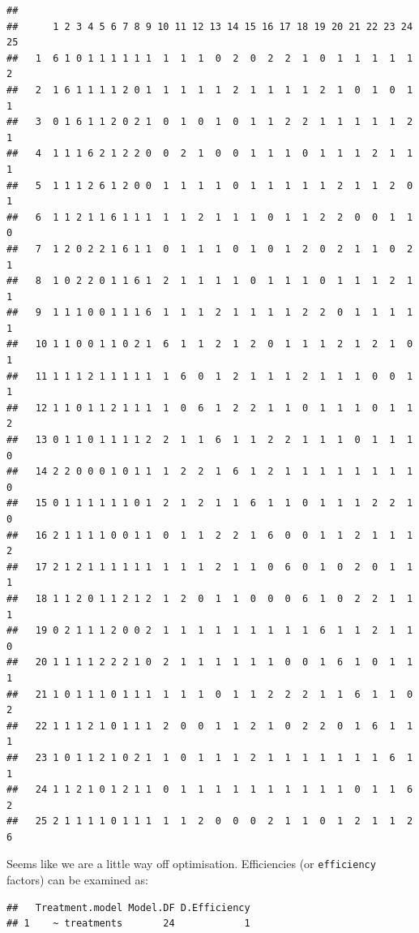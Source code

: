 \documentclass[
]{book}
\newenvironment{Shaded}{\begin{snugshade}}{\end{snugshade}}
\newcommand{\FloatTok}[1]{\textcolor[rgb]{0.00,0.00,0.81}{#1}}
\newcommand{\NormalTok}[1]{#1}
\newcommand{\SpecialCharTok}[1]{\textcolor[rgb]{0.00,0.00,0.00}{#1}}
\begin{document}
\begin{verbatim}
##     
##      1 2 3 4 5 6 7 8 9 10 11 12 13 14 15 16 17 18 19 20 21 22 23 24 25
##   1  6 1 0 1 1 1 1 1 1  1  1  1  0  2  0  2  2  1  0  1  1  1  1  1  2
##   2  1 6 1 1 1 1 2 0 1  1  1  1  1  2  1  1  1  1  2  1  0  1  0  1  1
##   3  0 1 6 1 1 2 0 2 1  0  1  0  1  0  1  1  2  2  1  1  1  1  1  2  1
##   4  1 1 1 6 2 1 2 2 0  0  2  1  0  0  1  1  1  0  1  1  1  2  1  1  1
##   5  1 1 1 2 6 1 2 0 0  1  1  1  1  0  1  1  1  1  1  2  1  1  2  0  1
##   6  1 1 2 1 1 6 1 1 1  1  1  2  1  1  1  0  1  1  2  2  0  0  1  1  0
##   7  1 2 0 2 2 1 6 1 1  0  1  1  1  0  1  0  1  2  0  2  1  1  0  2  1
##   8  1 0 2 2 0 1 1 6 1  2  1  1  1  1  0  1  1  1  0  1  1  1  2  1  1
##   9  1 1 1 0 0 1 1 1 6  1  1  1  2  1  1  1  1  2  2  0  1  1  1  1  1
##   10 1 1 0 0 1 1 0 2 1  6  1  1  2  1  2  0  1  1  1  2  1  2  1  0  1
##   11 1 1 1 2 1 1 1 1 1  1  6  0  1  2  1  1  1  2  1  1  1  0  0  1  1
##   12 1 1 0 1 1 2 1 1 1  1  0  6  1  2  2  1  1  0  1  1  1  0  1  1  2
##   13 0 1 1 0 1 1 1 1 2  2  1  1  6  1  1  2  2  1  1  1  0  1  1  1  0
##   14 2 2 0 0 0 1 0 1 1  1  2  2  1  6  1  2  1  1  1  1  1  1  1  1  0
##   15 0 1 1 1 1 1 1 0 1  2  1  2  1  1  6  1  1  0  1  1  1  2  2  1  0
##   16 2 1 1 1 1 0 0 1 1  0  1  1  2  2  1  6  0  0  1  1  2  1  1  1  2
##   17 2 1 2 1 1 1 1 1 1  1  1  1  2  1  1  0  6  0  1  0  2  0  1  1  1
##   18 1 1 2 0 1 1 2 1 2  1  2  0  1  1  0  0  0  6  1  0  2  2  1  1  1
##   19 0 2 1 1 1 2 0 0 2  1  1  1  1  1  1  1  1  1  6  1  1  2  1  1  0
##   20 1 1 1 1 2 2 2 1 0  2  1  1  1  1  1  1  0  0  1  6  1  0  1  1  1
##   21 1 0 1 1 1 0 1 1 1  1  1  1  0  1  1  2  2  2  1  1  6  1  1  0  2
##   22 1 1 1 2 1 0 1 1 1  2  0  0  1  1  2  1  0  2  2  0  1  6  1  1  1
##   23 1 0 1 1 2 1 0 2 1  1  0  1  1  1  2  1  1  1  1  1  1  1  6  1  1
##   24 1 1 2 1 0 1 2 1 1  0  1  1  1  1  1  1  1  1  1  1  0  1  1  6  2
##   25 2 1 1 1 1 0 1 1 1  1  1  2  0  0  0  2  1  1  0  1  2  1  1  2  6
\end{verbatim}

Seems like we are a little way off optimisation. Efficiencies (or \texttt{efficiency} factors) can be examined as:

\begin{Shaded}
\end{Shaded}

\begin{verbatim}
##   Treatment.model Model.DF D.Efficiency
## 1    ~ treatments       24            1
\end{verbatim}
\end{document}
